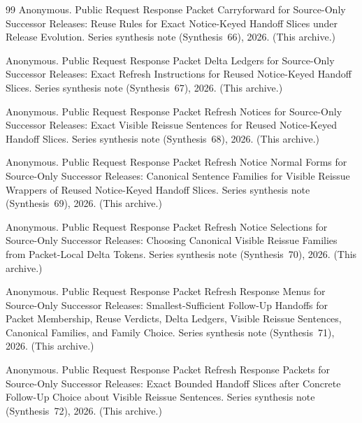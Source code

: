 \documentclass[11pt]{article}
\begin{document}
\begin{thebibliography}{99}
Anonymous.
\newblock Public Request Response Packet Carryforward for Source-Only Successor Releases: Reuse Rules for Exact Notice-Keyed Handoff Slices under Release Evolution.
\newblock Series synthesis note (Synthesis~66), 2026. (This archive.)

Anonymous.
\newblock Public Request Response Packet Delta Ledgers for Source-Only Successor Releases: Exact Refresh Instructions for Reused Notice-Keyed Handoff Slices.
\newblock Series synthesis note (Synthesis~67), 2026. (This archive.)

Anonymous.
\newblock Public Request Response Packet Refresh Notices for Source-Only Successor Releases: Exact Visible Reissue Sentences for Reused Notice-Keyed Handoff Slices.
\newblock Series synthesis note (Synthesis~68), 2026. (This archive.)

Anonymous.
\newblock Public Request Response Packet Refresh Notice Normal Forms for Source-Only Successor Releases: Canonical Sentence Families for Visible Reissue Wrappers of Reused Notice-Keyed Handoff Slices.
\newblock Series synthesis note (Synthesis~69), 2026. (This archive.)

Anonymous.
\newblock Public Request Response Packet Refresh Notice Selections for Source-Only Successor Releases: Choosing Canonical Visible Reissue Families from Packet-Local Delta Tokens.
\newblock Series synthesis note (Synthesis~70), 2026. (This archive.)

Anonymous.
\newblock Public Request Response Packet Refresh Response Menus for Source-Only Successor Releases: Smallest-Sufficient Follow-Up Handoffs for Packet Membership, Reuse Verdicts, Delta Ledgers, Visible Reissue Sentences, Canonical Families, and Family Choice.
\newblock Series synthesis note (Synthesis~71), 2026. (This archive.)

Anonymous.
\newblock Public Request Response Packet Refresh Response Packets for Source-Only Successor Releases: Exact Bounded Handoff Slices after Concrete Follow-Up Choice about Visible Reissue Sentences.
\newblock Series synthesis note (Synthesis~72), 2026. (This archive.)


\end{thebibliography}
\end{document}
